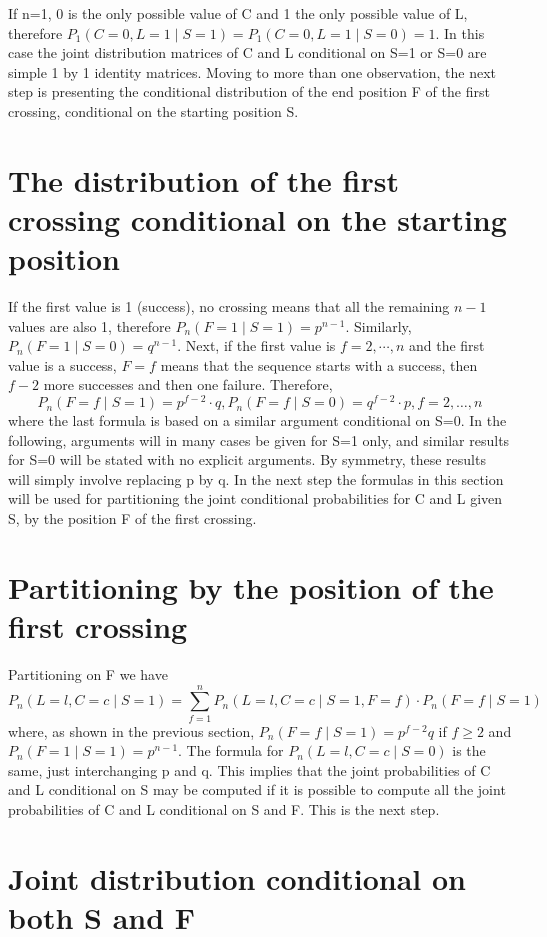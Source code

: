 If n=1, 0 is the only possible value of C and 1 the only possible value of L, therefore $P_1 (C=0,L=1 \mid S=1) = P_1 (C=0,L=1 \mid S=0) = 1$. In this case the joint distribution matrices of C and L conditional on S=1 or S=0 are simple 1 by 1 identity matrices. Moving to more than one observation, the next step is presenting the conditional distribution of the end position F of the first crossing, conditional on the starting position S.

\section{The distribution of the first crossing conditional on the starting position}

If the first value is 1 (success), no crossing means that all the remaining $n-1$ values are also 1, therefore $P_n (F=1 \mid S=1) = p^{n-1}$. Similarly, $P_n(F=1 \mid S=0) = q^{n-1}$. Next, if the first value is $f=2, \cdots ,n$ and the first value is a success, $F=f$ means that the sequence starts with a success, then $f-2$ more successes and then one failure. Therefore, $$P_n (F=f \mid S=1) = p^{f-2} \cdot q, P_n (F=f \mid S=0) =q^{f-2} \cdot p, f=2, \ldots ,n$$
where the last formula is based on a similar argument conditional on S=0. In the following, arguments will in many cases be given for S=1 only, and similar results for S=0 will be stated with no explicit arguments. By symmetry, these results will simply involve replacing p by q. In the next step the formulas in this section will be used for partitioning the joint conditional probabilities for C and L given S, by the position F of the first crossing. 

\section{Partitioning by the position of the first crossing}

Partitioning on  F we have $$P_n (L=l,C=c \mid S=1) = \sum_{f=1}^n P_n(L=l,C=c \mid S=1,F=f) \cdot P_n (F=f \mid S=1)$$
where, as shown in the previous section,  $P_n (F=f \mid S=1) =p^{f-2}q$ if $f \geq 2$ and $P_n (F=1 \mid S=1) = p^{n-1}$. The formula for $P_n (L=l,C=c \mid S=0)$ is the same, just interchanging p and q. This implies that the joint probabilities of C and L conditional on S may be computed if it is possible to compute all the joint probabilities of C and L conditional on S and F. This is the next step.

\section{Joint distribution conditional on both S and F}

